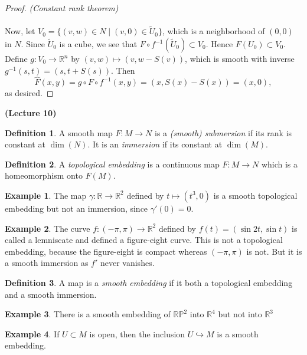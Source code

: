 \documentclass[10pt,letterpaper,cm]{nupset}
\theoremstyle{definition}
\newtheorem*{definition}{Definition}
\newtheorem{exmp}{Example}
\newcommand{\R}{\mathbb R}
\newcommand{\RP}{\mathbb{RP}}
\newcommand{\1}{\mathbf{1}}
\newcommand{\0}{\vec 0}
\begin{document}
\begin{proof}{\textit{(Constant rank theorem)}}
\\ \\ Now, let $V_0 = \{(v,w) \in N \mid (v,0)\in \widetilde{U}_0\}$, which is a neighborhood of $(0,0)$ in  $N$. Since $\widetilde{U}_0$ is a cube, we see that $F \circ f^{-1}(\widetilde{U}_0) \subset V_0$. Hence $F(U_0) \subset V_0$.  Define $g : V_0 \to \R^n$ by $(v,w) \mapsto (v, w-S(v))$, which is smooth with inverse $g^{-1}(s,t) = (s, t + S(s))$. Then $$\widehat{F}(x,y) = g \circ F \circ f^{-1}(x,y) = (x, S(x) - S(x)) = (x,0),$$ as desired.
\end{proof}

\begin{center}
{\textbf{(Lecture 10)}} 
\end{center}

\begin{definition}
A smooth map $F: M \to N$ is a \textit{(smooth) submersion} if its rank is constant at $\dim(N)$. It is an \textit{immersion} if its constant at $\dim(M)$.
\end{definition}

\begin{definition}
A \textit{topological embedding} is a continuous map $F: M \to N$ which is a homeomorphism onto $F(M)$.
\end{definition}

\begin{exmp}
The map $\gamma: \R \to \R^2$ defined by $t\mapsto (t^3, 0)$ is a smooth topological embedding but not an immersion, since $\gamma'(0) =0$.
\end{exmp}

\begin{exmp}
The curve $f: (-\pi, \pi) \to \R^2$ defined by $f(t) = (\sin 2t , \sin t)$ is called a lemniscate and defined a figure-eight curve. This is not a topological embedding, because the figure-eight is compact whereas $(-\pi, \pi)$ is not. But it is a smooth immersion as $f'$ never vanishes. 
\end{exmp}

\begin{definition}
A map is a \textit{smooth embedding} if it both a topological embedding and a smooth immersion.
\end{definition}

\begin{exmp}
There is a smooth embedding of $\RP^2$ into $\R^4$ but not into $\R^3$
\end{exmp}

\begin{exmp}
If $U \subset M$ is open, then the inclusion $U \hookrightarrow M$ is a smooth embedding.
\end{exmp}
\end{document}
